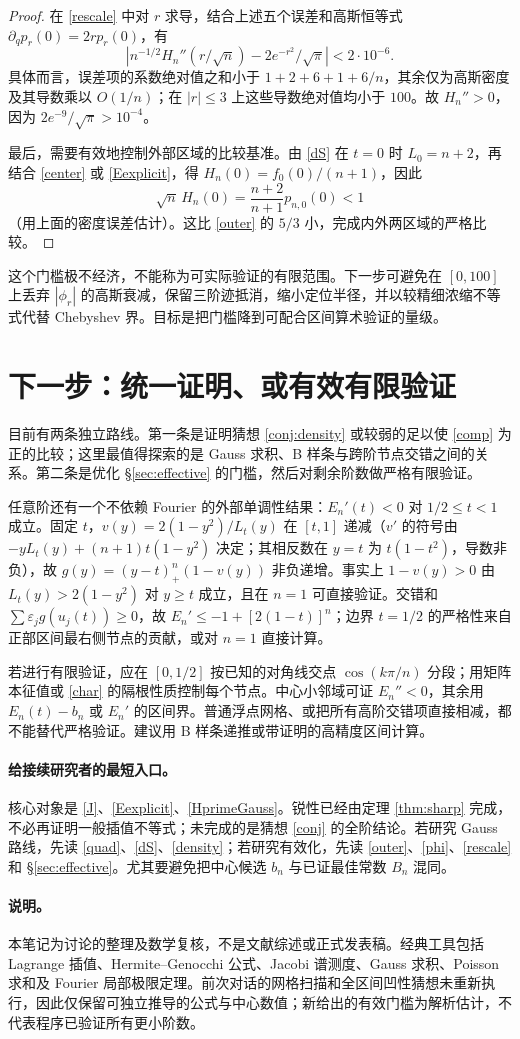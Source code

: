 \documentclass[11pt,a4paper,fontset=fandol]{ctexart}
\theoremstyle{remark}\newtheorem{conjecture}{猜想}
\begin{document}
\begin{proof}
在 \eqref{rescale} 中对 $r$ 求导，结合上述五个误差和高斯恒等式 $\partial_qp_r(0)=2rp_r(0)$，有
\[
 \left|n^{-1/2}H_n''(r/\sqrt n)-2e^{-r^2}/\sqrt\pi\right|<2\cdot10^{-6}.
\]
具体而言，误差项的系数绝对值之和小于 $1+2+6+1+6/n$，其余仅为高斯密度及其导数乘以 $O(1/n)$；在 $|r|\le3$ 上这些导数绝对值均小于 $100$。故 $H_n''>0$，因为 $2e^{-9}/\sqrt\pi>10^{-4}$。

最后，需要有效地控制外部区域的比较基准。由 \eqref{dS} 在 $t=0$ 时 $L_0=n+2$，再结合 \eqref{center} 或 \eqref{Eexplicit}，得 $H_n(0)=f_0(0)/(n+1)$，因此
\[
 \sqrt n\,H_n(0)=\frac{n+2}{n+1}p_{n,0}(0)<1
\]
（用上面的密度误差估计）。这比 \eqref{outer} 的 $5/3$ 小，完成内外两区域的严格比较。
\end{proof}
这个门槛极不经济，不能称为可实际验证的有限范围。下一步可避免在 $[0,100]$ 上丢弃 $|\phi_r|$ 的高斯衰减，保留三阶迹抵消，缩小定位半径，并以较精细浓缩不等式代替 Chebyshev 界。目标是把门槛降到可配合区间算术验证的量级。

\section{下一步：统一证明、或有效有限验证}
目前有两条独立路线。第一条是证明猜想 \ref{conj:density} 或较弱的足以使 \eqref{comp} 为正的比较；这里最值得探索的是 Gauss 求积、B 样条与跨阶节点交错之间的关系。第二条是优化 \S\ref{sec:effective} 的门槛，然后对剩余阶数做严格有限验证。

任意阶还有一个不依赖 Fourier 的外部单调性结果：$E_n'(t)<0$ 对 $1/2\le t<1$ 成立。固定 $t$，$v(y)=2(1-y^2)/L_t(y)$ 在 $[t,1]$ 递减（$v' $ 的符号由 $-yL_t(y)+(n+1)t(1-y^2)$ 决定；其相反数在 $y=t$ 为 $t(1-t^2)$，导数非负），故 $g(y)=(y-t)_+^n(1-v(y))$ 非负递增。事实上 $1-v(y)>0$ 由 $L_t(y)>2(1-y^2)$ 对 $y\ge t$ 成立，且在 $n=1$ 可直接验证。交错和 $\sum\varepsilon_j g(u_j(t))\ge0$，故 $E_n'\le-1+[2(1-t)]^n$；边界 $t=1/2$ 的严格性来自正部区间最右侧节点的贡献，或对 $n=1$ 直接计算。

若进行有限验证，应在 $[0,1/2]$ 按已知的对角线交点 $\cos(k\pi/n)$ 分段；用矩阵本征值或 \eqref{char} 的隔根性质控制每个节点。中心小邻域可证 $E_n''<0$，其余用 $E_n(t)-b_n$ 或 $E_n'$ 的区间界。普通浮点网格、或把所有高阶交错项直接相减，都不能替代严格验证。建议用 B 样条递推或带证明的高精度区间计算。

\paragraph{给接续研究者的最短入口。} 核心对象是 \eqref{J}、\eqref{Eexplicit}、\eqref{HprimeGauss}。锐性已经由定理 \ref{thm:sharp} 完成，不必再证明一般插值不等式；未完成的是猜想 \ref{conj} 的全阶结论。若研究 Gauss 路线，先读 \eqref{quad}、\eqref{dS}、\eqref{density}；若研究有效化，先读 \eqref{outer}、\eqref{phi}、\eqref{rescale} 和 \S\ref{sec:effective}。尤其要避免把中心候选 $b_n$ 与已证最佳常数 $B_n$ 混同。

\paragraph{说明。} 本笔记为讨论的整理及数学复核，不是文献综述或正式发表稿。经典工具包括 Lagrange 插值、Hermite--Genocchi 公式、Jacobi 谱测度、Gauss 求积、Poisson 求和及 Fourier 局部极限定理。前次对话的网格扫描和全区间凹性猜想未重新执行，因此仅保留可独立推导的公式与中心数值；新给出的有效门槛为解析估计，不代表程序已验证所有更小阶数。
\end{document}
